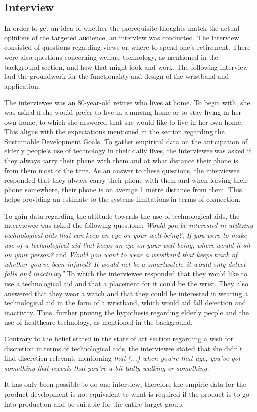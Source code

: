 \subsection{Interview}
In order to get an idea of whether the prerequisite thoughts match the actual opinions of the targeted audience, an interview was conducted. The interview consisted of questions regarding views on where to spend one's retirement. There were also questions concerning welfare technology, as mentioned in the background section, and how that might look and work. The following interview laid the groundwork for the functionality and design of the wristband and application. 

The interviewee was an 80-year-old retiree who lives at home. To begin with, she was asked if she would prefer to live in a nursing home or to stay living in her own home, to which she answered that she would like to live in her own home. This aligns with the expectations mentioned in the section regarding the Sustainable Development Goals. To gather empirical data on the anticipation of elderly people’s use of technology in their daily lives, the interviewee was asked if they always carry their phone with them and at what distance their phone is from them most of the time. As an answer to these questions, the interviewee responded that they always carry their phone with them and when leaving their phone somewhere, their phone is on average 1 metre distance from them. This helps providing an estimate to the systems limitations in terms of connection. 

To gain data regarding the attitude towards the use of technological aids, the interviewee was asked the following questions: \textit{Would you be interested in utilizing technological aids that can keep an eye on your well-being?},  \textit{If you were to make use of a technological aid that keeps an eye on your well-being, where would it sit on your person?} and \textit{Would you want to wear a wristband that keeps track of whether you’ve been injured? It would not be a smartwatch, it would only detect falls and inactivity”} To which the interviewee responded that they would like to use a technological aid and that a placement for it could be the wrist. They also answered that they wear a watch and that they could be interested in wearing a technological aid in the form of a wristband, which would aid fall detection and inactivity. Thus, further proving the hypothesis regarding elderly people and the use of healthcare technology, as mentioned in the background. 

Contrary to the belief stated in the state of art section regarding a wish for discretion in terms of technological aids, the interviewee stated that she didn’t find discretion relevant, mentioning \textit{that (...) when you’re that age, you've got something that reveals that you’re a bit badly walking or something.}

It has only been possible to do one interview,  therefore the empiric data for the product development is not equivalent to what is required if the product is to go into production and be suitable for the entire target group. 


